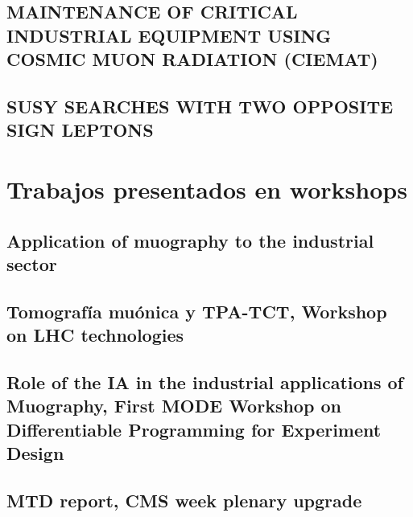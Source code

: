 \documentclass[a4paper, 11pt, twoside, openright]{report}
\begin{document}
\subsection{MAINTENANCE OF CRITICAL INDUSTRIAL EQUIPMENT USING COSMIC MUON RADIATION (CIEMAT)}


\subsection{SUSY SEARCHES WITH TWO OPPOSITE SIGN LEPTONS}


\section{Trabajos presentados en workshops}


\subsection{Application of muography to the industrial sector}


\subsection{Tomografía muónica y TPA-TCT, Workshop on LHC technologies}


\subsection{Role of the IA in the industrial applications of Muography, First MODE Workshop on Differentiable Programming for Experiment Design}


\subsection{MTD report, CMS week plenary upgrade}

\end{document}
